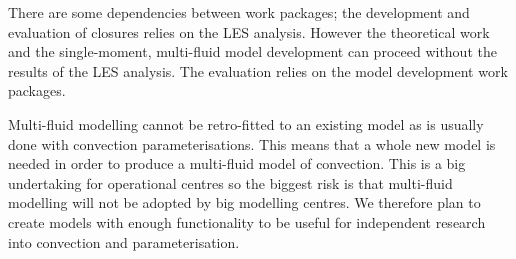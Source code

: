 \documentclass[11pt,a4paper]{article}
\begin{document}
There are some dependencies between work packages; the development and evaluation of closures relies on the LES analysis. However the theoretical work and the single-moment, multi-fluid model development can proceed without the results of the LES analysis. The evaluation relies on the model development work packages.

Multi-fluid modelling cannot be retro-fitted to an existing model as is usually done with convection parameterisations. This means that a whole new model is needed in order to produce a multi-fluid model of convection. This is a big undertaking for operational centres so the biggest risk is that multi-fluid modelling will not be adopted by big modelling centres. We therefore plan to create models with enough functionality to be useful for independent research into convection and parameterisation.

\renewcommand\refname{Reference (not included in Track Record)}

%

\end{document}
